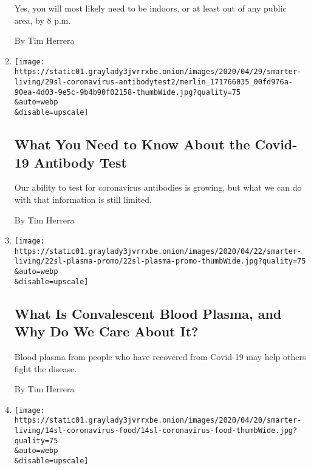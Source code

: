 \begin{enumerate}
  Yes, you will most likely need to be indoors, or at least out of any
  public area, by 8 p.m.

  By Tim Herrera
\item
  \href{/article/antibody-test-coronavirus.html}{}

  \texttt{[image: https://static01.graylady3jvrrxbe.onion/images/2020/04/29/smarter-living/29sl-coronavirus-antibodytest2/merlin\_171766035\_00fd976a-90ea-4d03-9e5c-9b4b90f02158-thumbWide.jpg?quality=75\\\&auto=webp\\\&disable=upscale]}

  \hypertarget{what-you-need-to-know-about-the-covid-19-antibody-test}{%
  \subsection{What You Need to Know About the Covid-19 Antibody
  Test}\label{what-you-need-to-know-about-the-covid-19-antibody-test}}

  Our ability to test for coronavirus antibodies is growing, but what we
  can do with that information is still limited.

  By Tim Herrera
\item
  \href{/2020/04/24/smarter-living/coronavirus-convalescent-plasma-antibodies.html}{}

  \texttt{[image: https://static01.graylady3jvrrxbe.onion/images/2020/04/22/smarter-living/22sl-plasma-promo/22sl-plasma-promo-thumbWide.jpg?quality=75\\\&auto=webp\\\&disable=upscale]}

  \hypertarget{what-is-convalescent-blood-plasma-and-why-do-we-care-about-it}{%
  \subsection{What Is Convalescent Blood Plasma, and Why Do We Care
  About
  It?}\label{what-is-convalescent-blood-plasma-and-why-do-we-care-about-it}}

  Blood plasma from people who have recovered from Covid-19 may help
  others fight the disease.

  By Tim Herrera
\item
  \href{/2020/04/15/smarter-living/coronavirus-eating-advice.html}{}

  \texttt{[image: https://static01.graylady3jvrrxbe.onion/images/2020/04/20/smarter-living/14sl-coronavirus-food/14sl-coronavirus-food-thumbWide.jpg?quality=75\\\&auto=webp\\\&disable=upscale]}

  \hypertarget{eating-is-weird-now-heres-how-to-kind-of-get-back-to-normal}{%
}
\end{enumerate}
